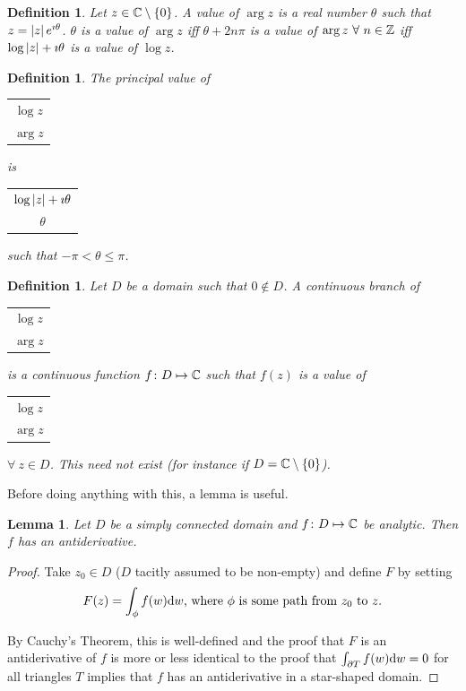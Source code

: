 \documentclass{notes}
\theoremstyle{plain}
\newtheorem{definition}[proposition]{Definition}
\newtheorem{lemma}[proposition]{Lemma}
\begin{document}
\begin{definition}
Let $z \in \mathbb{C} \setminus \{ 0 \}$.  A value of $\arg z$ is a real number
$\theta$ such that $z = \left|z\right| e^{\imath \theta}$.  $\theta$ is a value of
$\arg z$ iff $\theta + 2 n \pi$ is a value of $\arg z\ \forall\ n \in \mathbb{Z}$
iff $\log \left|z\right| + \imath \theta$ is a value of $\log z$.
\end{definition}

\begin{definition}
The principal value%
 of \begin{tabular}{c}
$\log z$ \\ $\arg z$
\end{tabular} is \begin{tabular}{c}
$\log \left|z\right| + \imath \theta$ \\ $\theta$
\end{tabular} such that $-\pi < \theta \le \pi$. 
\end{definition}

\begin{definition}
Let $D$ be a domain such that $0 \notin D$.  A continuous branch%
 of \begin{tabular}{c}
$\log z$ \\ $\arg z$
\end{tabular} is a continuous function $f \colon D \mapsto \mathbb{C}$ such that $f(z)$
is a value of \begin{tabular}{c}
$\log z$ \\ $\arg z$
\end{tabular} $\forall\ z \in D$.  This need not exist (for instance if
$D = \mathbb{C} \setminus \{ 0 \}$).
\end{definition}

Before doing anything with this, a lemma is useful.

\begin{lemma}
Let $D$ be a simply connected domain and $f \colon D \mapsto \mathbb{C}$ be analytic.
Then $f$ has an antiderivative.
\end{lemma}

\begin{proof}
Take $z_0 \in D$ ($D$ tacitly assumed to be non-empty) and define $F$ by
setting
\[
F(z) = \int_\phi f(w) \mathrm{d} w \text{, where $\phi$ is some path from $z_0$ to $z$.}
\]

By Cauchy's Theorem, this is well-defined and the proof that $F$ is an
antiderivative of $f$ is more or less identical to the proof that
$\int_{\partial T} f(w) \mathrm{d} w = 0$ for all triangles $T$ implies that $f$ has
an antiderivative in a star-shaped domain.
\end{proof}
\end{document}
